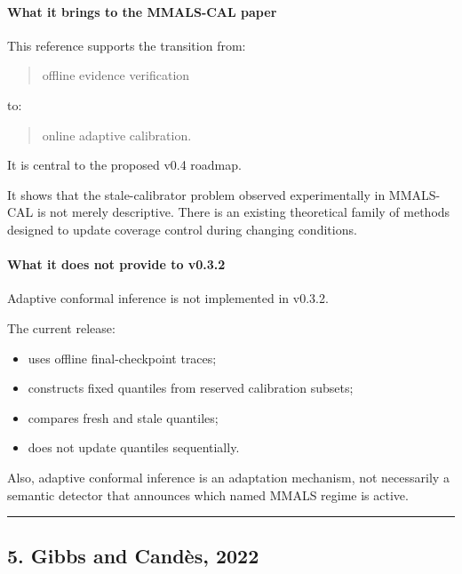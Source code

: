 \paragraph{What it brings to the MMALS-CAL paper}\label{what-it-brings-to-the-mmals-cal-paper-3}

This reference supports the transition from:

\begin{quote}
offline evidence verification
\end{quote}

to:

\begin{quote}
online adaptive calibration.
\end{quote}

It is central to the proposed v0.4 roadmap.

It shows that the stale-calibrator problem observed experimentally in MMALS-CAL is not merely descriptive. There is an existing theoretical family of methods designed to update coverage control during changing conditions.

\paragraph{\texorpdfstring{What it does \textbf{not} provide to v0.3.2}{What it does not provide to v0.3.2}}\label{what-it-does-not-provide-to-v0.3.2}

Adaptive conformal inference is not implemented in v0.3.2.

The current release:

\begin{itemize}
\tightlist
\item
  uses offline final-checkpoint traces;
\item
  constructs fixed quantiles from reserved calibration subsets;
\item
  compares fresh and stale quantiles;
\item
  does not update quantiles sequentially.
\end{itemize}

Also, adaptive conformal inference is an adaptation mechanism, not necessarily a semantic detector that announces which named MMALS regime is active.

\begin{center}\rule{0.5\linewidth}{0.5pt}\end{center}

\subsection{5. Gibbs and Candès, 2022}\label{gibbs-and-canduxe8s-2022}

